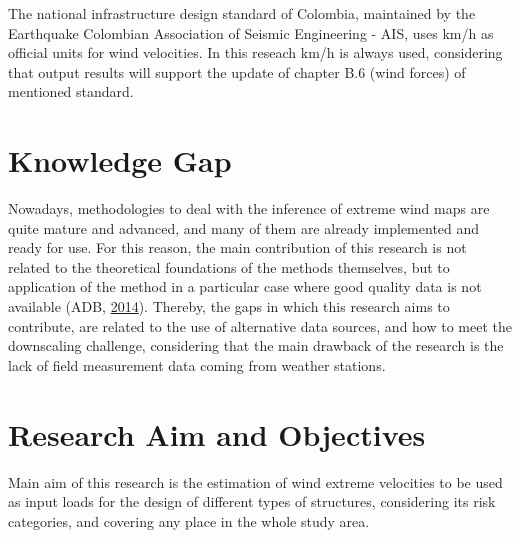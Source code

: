 \documentclass[12pt,oneside]{reedthesis}
\begin{document}
The national infrastructure design standard of Colombia, maintained by the Earthquake Colombian Association of Seismic Engineering - AIS, uses km/h as official units for wind velocities. In this reseach km/h is always used, considering that output results will support the update of chapter B.6 (wind forces) of mentioned standard.

\hypertarget{knowledge-gap}{%
\section{Knowledge Gap}\label{knowledge-gap}}

Nowadays, methodologies to deal with the inference of extreme wind maps are quite mature and advanced, and many of them are already implemented and ready for use. For this reason, the main contribution of this research is not related to the theoretical foundations of the methods themselves, but to application of the method in a particular case where good quality data is not available (ADB, \protect\hyperlink{ref-windassessment}{2014}). Thereby, the gaps in which this research aims to contribute, are related to the use of alternative data sources, and how to meet the downscaling challenge, considering that the main drawback of the research is the lack of field measurement data coming from weather stations.

\hypertarget{research-aim-and-objectives}{%
\section{Research Aim and Objectives}\label{research-aim-and-objectives}}

Main aim of this research is the estimation of wind extreme velocities to be used as input loads for the design of different types of structures, considering its risk categories, and covering any place in the whole study area.
\end{document}
